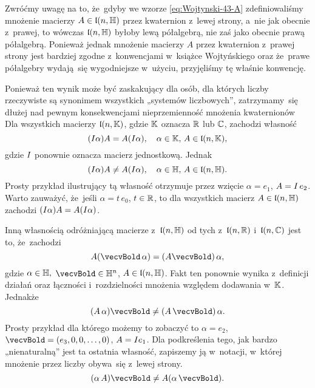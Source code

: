 \documentclass[a4paper,11pt]{article}
\numberwithin{equation}{section}
\begin{document}
Zwróćmy uwagę na to, że~gdyby we wzorze \eqref{eq:Wojtynski-43-A}
zdefiniowaliśmy mnożenie macierzy $A \in \mathfrak{l}( n, \mathbb{H} )$ przez kwaternion
z~lewej strony, a~nie jak obecnie z~prawej, to wówczas $\mathfrak{l}( n, \mathbb{H} )$
byłoby lewą półalgebrą, nie zaś jako obecnie prawą półalgebrą. Ponieważ
jednak mnożenie macierzy $A$ przez kwaternion z~prawej strony jest bardziej
zgodne z~konwencjami w~książce Wojtyńskiego oraz że~prawe półalgebry
wydają~się wygodniejsze w~użyciu, przyjęliśmy tę właśnie konwencję.

Ponieważ ten wynik może być zaskakujący dla osób, dla których liczby
rzeczywiste są synonimem wszystkich „systemów liczbowych”, zatrzymamy~się
dłużej nad pewnym konsekwencjami nieprzemienność mnożenia kwaternionów Dla
wszystkich macierzy $\mathfrak{l}( n, \mathbb{K} )$, gdzie $\mathbb{K}$ oznacza $\mathbb{R}$ lub
$\mathbb{C}$, zachodzi własność
\begin{equation}
  \label{eq:Wojtynski-54}
  ( I \alpha ) A = A ( I \alpha ), \quad
  \alpha \in \mathbb{K}, \, A \in \mathfrak{l}( n, \mathbb{K} ),
\end{equation}
gdzie $I$ ponownie oznacza macierz jednostkową. Jednak
\begin{equation}
  \label{eq:Wojtynski-55}
  ( I \alpha ) A \neq A ( I \alpha ), \quad
  \alpha \in \mathbb{H}, \, A \in \mathfrak{l}( n, \mathbb{H} ).
\end{equation}
Prosty przykład ilustrujący tą własność otrzymuje przez wzięcie
$\alpha = e_{ 1 }$, $A = I \, e_{ 2 }$. Warto zauważyć, że~jeśli
$\alpha = t \, e_{ 0 }$, $t \in \mathbb{R}$, to dla wszystkich macierz
$A \in \mathfrak{l}( n, \mathbb{H} )$ zachodzi $( I \alpha ) A = A ( I \alpha )$.

Inną własnością odróżniającą macierze z~$\mathfrak{l}( n, \mathbb{H} )$ od tych
z~$\mathfrak{l}( n, \mathbb{R} )$ i~$\mathfrak{l}( n, \mathbb{C} )$ jest to,
że~zachodzi
\begin{equation}
  \label{eq:Wojtynski-56}
  A ( \vecvBold \, \alpha ) = ( A \vecvBold ) \, \alpha,
\end{equation}
gdzie $\alpha \in \mathbb{H},$ $\vecvBold \in \Hbb^{ n }$, $A \in \mathfrak{l}( n, \mathbb{H} )$. Fakt
ten ponownie wynika z~definicji działań oraz łączności i~rozdzielności
mnożenia
względem dodawania w~$\mathbb{K}$. Jednakże
\begin{equation}
  \label{eq:Wojtynski-57}
  ( A \, \alpha ) \vecvBold \neq ( A \, \vecvBold ) \, \alpha.
\end{equation}
Prosty przykład dla którego możemy to zobaczyć to $\alpha = e_{ 2 }$,
$\vecvBold = ( e_{ 3 }, 0, 0, \ldots, 0 )$, $A = I e_{ 1 }$. Dla
podkreślenia tego,
jak bardzo „nienaturalną” jest ta ostatnia własność, zapiszemy ją
w~notacji, w~której mnożenie przez liczby obywa~się z~lewej strony.
\begin{equation}
  \label{eq:Wojtynski-58}
  ( \alpha \, A ) \vecvBold \neq A ( \alpha \, \vecvBold ).
\end{equation}
\end{document}
